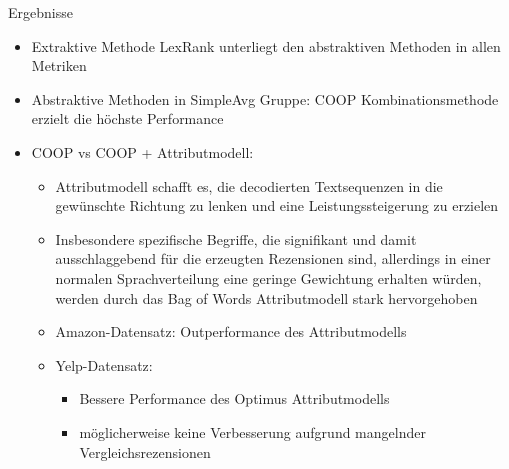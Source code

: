 \begin{frame}{Ergebnisse}

  \begin{itemize}
    \item Extraktive Methode LexRank unterliegt den abstraktiven Methoden in allen Metriken
    \item Abstraktive Methoden in SimpleAvg Gruppe: COOP Kombinationsmethode erzielt die höchste Performance
    \item COOP vs COOP + Attributmodell: 
    \begin{itemize}
      \item Attributmodell schafft es, die decodierten Textsequenzen in die gewünschte Richtung zu lenken und eine Leistungssteigerung zu erzielen
      \item Insbesondere spezifische Begriffe, die signifikant und damit ausschlaggebend für die erzeugten Rezensionen sind, allerdings in einer normalen Sprachverteilung eine geringe Gewichtung erhalten würden, werden durch das Bag of Words Attributmodell stark hervorgehoben
      \item Amazon-Datensatz: Outperformance des Attributmodells
      \item Yelp-Datensatz: \begin{itemize} \item Bessere Performance des Optimus Attributmodells
      \item möglicherweise keine Verbesserung aufgrund mangelnder Vergleichsrezensionen \end{itemize}
    \end{itemize}
  \end{itemize}
\end{frame}



